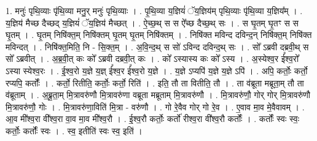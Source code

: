 \documentclass[17pt]{extarticle}
\begin{document}
1. मनुः॑ पृथि॒व्याः पृ॑थि॒व्या मनु॒र् मनुः॑ पृथि॒व्याः । . पृ॒थि॒व्या य॒ज्ञियं॑ ॅय॒ज्ञिय॑म् पृथि॒व्याः पृ॑थि॒व्या य॒ज्ञिय᳚म् । . य॒ज्ञिय॑ मैच्छ दैच्छद् य॒ज्ञियं॑ ॅय॒ज्ञिय॑ मैच्छत् । . ऐ॒च्छ॒थ् स स ऐ᳚च्छ दैच्छ॒थ् सः । . स घृ॒तम् घृ॒तꣳ स स घृ॒तम् । . घृ॒तम् निषि॑क्त॒म् निषि॑क्तम् घृ॒तम् घृ॒तम् निषि॑क्तम् । . निषि॑क्त मविन्द दविन्द॒न् निषि॑क्त॒म् निषि॑क्त मविन्दत् । . निषि॑क्त॒मिति॒ नि - सि॒क्त॒म् । . अ॒वि॒न्द॒थ् स सो॑ ऽविन्द दविन्द॒थ् सः । . सो᳚ ऽब्रवी दब्रवी॒थ् स सो᳚ ऽब्रवीत् । . अ॒ब्र॒वी॒त् कः को᳚ ऽब्रवी दब्रवी॒त् कः । . को᳚ ऽस्यास्य कः को᳚ ऽस्य । . अ॒स्येश्व॒र ई᳚श्व॒रो᳚ ऽस्या स्येश्व॒रः । . ई॒श्व॒रो य॒ज्ञे य॒ज्ञ् ई᳚श्व॒र ई᳚श्व॒रो य॒ज्ञे । . य॒ज्ञे ऽप्यपि॑ य॒ज्ञे य॒ज्ञे ऽपि॑ । . अपि॒ कर्तोः॒ कर्तो॒ रप्यपि॒ कर्तोः᳚ । . कर्तो॒ रितीति॒ कर्तोः॒ कर्तो॒ रिति॑ । . इति॒ तौ ता वितीति॒ तौ । . ता व॑ब्रूता मब्रूता॒म् तौ ता व॑ब्रूताम् । . अ॒ब्रू॒ता॒म् मि॒त्रावरु॑णौ मि॒त्रावरु॑णा वब्रूता मब्रूताम् मि॒त्रावरु॑णौ । . मि॒त्रावरु॑णौ॒ गोर् गोर् मि॒त्रावरु॑णौ मि॒त्रावरु॑णौ॒ गोः । . मि॒त्रावरु॑णा॒विति॑ मि॒त्रा - वरु॑णौ । . गो रे॒वैव गोर् गो रे॒व । . ए॒वाव मा॒व मे॒वैवावम् । . आ॒व मी᳚श्व॒रा वी᳚श्व॒रा वा॒व मा॒व मी᳚श्व॒रौ । . ई॒श्व॒रौ कर्तोः॒ कर्तो॑ रीश्व॒रा वी᳚श्व॒रौ कर्तोः᳚ । . कर्तोः᳚ स्वः स्वः॒ कर्तोः॒ कर्तोः᳚ स्वः । . स्व॒ इतीति॑ स्वः स्व॒ इति॑ । \newline
\end{document}
